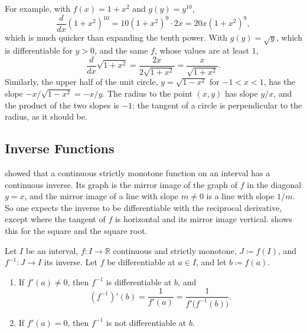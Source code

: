 For example, with $f(x)=1+x^2$ and $g(y)=y^{10}$,
\[
\frac d{dx}(1+x^2)^{10}=10(1+x^2)^9\cdot2x=20x(1+x^2)^9 ,
\]
which is much quicker than expanding the tenth power. With $g(y)=\sqrt y$, which is differentiable for $y>0$, and the same $f$, whose values are at least $1$,
\[
\frac d{dx}\sqrt{1+x^2}=\frac{2x}{2\sqrt{1+x^2}}=\frac x{\sqrt{1+x^2}} .
\]
Similarly, the upper half of the unit circle, $y=\sqrt{1-x^2}$ for $-1<x<1$, has the slope $-x/\sqrt{1-x^2}=-x/y$. The radius to the point $(x,y)$ has slope $y/x$, and the product of the two slopes is $-1$: the tangent of a circle is perpendicular to the radius, as it should be.

\subsection{Inverse Functions}

 showed that a continuous strictly monotone function on an interval has a continuous inverse. Its graph is the mirror image of the graph of $f$ in the diagonal $y=x$, and the mirror image of a line with slope $m\ne0$ is a line with slope $1/m$. So one expects the inverse to be differentiable with the reciprocal derivative, except where the tangent of $f$ is horizontal and its mirror image vertical.  shows this for the square and the square root.

\begin{theorem}
\label{thm:inverse-derivative}
Let $I$ be an interval, $f\colon I\to\mathbb R$ continuous and strictly monotone, $J\coloneqq f(I)$, and $f^{-1}\colon J\to I$ its inverse. Let $f$ be differentiable at $a\in I$, and let $b\coloneqq f(a)$.
\begin{enumerate}
\item If $f'(a)\ne0$, then $f^{-1}$ is differentiable at $b$, and
\[
(f^{-1})'(b)=\frac1{f'(a)}=\frac1{f'\bigl(f^{-1}(b)\bigr)} .
\]
\item If $f'(a)=0$, then $f^{-1}$ is not differentiable at $b$.
\end{enumerate}
\end{theorem}

